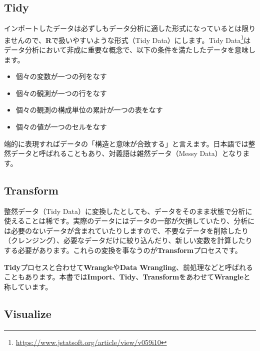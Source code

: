 \documentclass[
  12pt,
]{book}
\DeclareRobustCommand{\href}[2]{#2\footnote{\url{#1}}}
\providecommand{\tightlist}{%
  \setlength{\itemsep}{0pt}\setlength{\parskip}{0pt}}
\begin{document}
\hypertarget{tidy}{%
\subsection*{Tidy}\label{tidy}}

インポートしたデータは必ずしもデータ分析に適した形式になっているとは限りませんので、\textbf{R}で扱いやすいような形式（Tidy Data）にします。\href{https://www.jstatsoft.org/article/view/v059i10}{Tidy Data}\citep{R-TidyData}はデータ分析において非成に重要な概念で、以下の条件を満たしたデータを意味します。

\begin{itemize}
\tightlist
\item
  個々の変数が一つの列をなす
\item
  個々の観測が一つの行をなす
\item
  個々の観測の構成単位の累計が一つの表をなす
\item
  個々の値が一つのセルをなす
\end{itemize}

端的に表現すればデータの「構造と意味が合致する」と言えます。日本語では整然データと呼ばれることもあり、対義語は雑然データ（Messy Data）となります。

\hypertarget{transform}{%
\subsection*{Transform}\label{transform}}

整然データ（Tidy Data）に変換したとしても、データをそのまま状態で分析に使えることは稀です。実際のデータにはデータの一部が欠損していたり、分析には必要のないデータが含まれていたりしますので、不要なデータを削除したり（クレンジング）、必要なデータだけに絞り込んだり、新しい変数を計算したりする必要があります。これらの変換を事なうのが\textbf{Transform}プロセスです。

\textbf{Tidy}プロセスと合わせて\textbf{Wrangle}や\textbf{Data Wrangling}、前処理などと呼ばれることもあります。本書では\textbf{Import}、\textbf{Tidy}、\textbf{Transform}をあわせて\textbf{Wrangle}と称しています。

\hypertarget{visualize}{%
\subsection*{Visualize}\label{visualize}}
\end{document}
